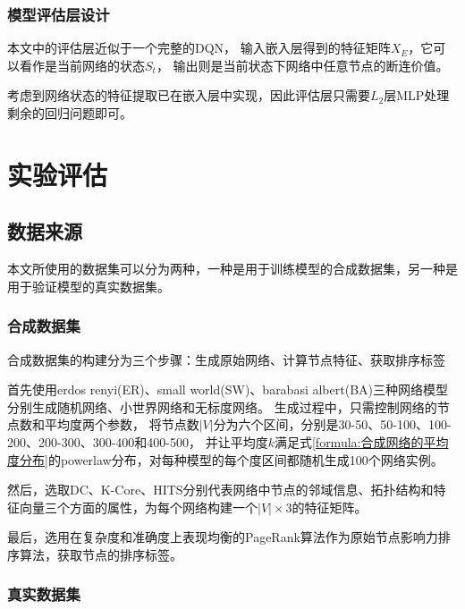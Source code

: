 \documentclass[twocolumn]{morningstar}
\begin{document}
\subsubsection{模型评估层设计}\label{sec:ValuingLayer}

本文中的评估层近似于一个完整的DQN，
输入嵌入层得到的特征矩阵$X_E$，它可以看作是当前网络的状态$S_t$，
输出则是当前状态下网络中任意节点的断连价值。



考虑到网络状态的特征提取已在嵌入层中实现，因此评估层只需要$L_2$层MLP处理剩余的回归问题即可。


\section{实验评估}\label{sec:ExperimentalEvaluation}

\subsection{数据来源}\label{sec:DataCollection}

本文所使用的数据集可以分为两种，一种是用于训练模型的合成数据集，另一种是用于验证模型的真实数据集。


\subsubsection{合成数据集}\label{sec:SyntheticDataset}

合成数据集的构建分为三个步骤：生成原始网络、计算节点特征、获取排序标签

首先使用erdos renyi(ER)、small world(SW)、barabasi albert(BA)三种网络模型分别生成随机网络、小世界网络和无标度网络。
生成过程中，只需控制网络的节点数和平均度两个参数，
将节点数$|V|$分为六个区间，分别是30-50、50-100、100-200、200-300、300-400和400-500，
并让平均度$k$满足式\ref{formula:合成网络的平均度分布}的powerlaw分布，对每种模型的每个度区间都随机生成100个网络实例。



然后，选取DC、K-Core\cite{gao2021K-Core}、HITS分别代表网络中节点的邻域信息、拓扑结构和特征向量三个方面的属性，为每个网络构建一个$|V|\times3$的特征矩阵。

最后，选用在复杂度和准确度上表现均衡的PageRank算法作为原始节点影响力排序算法，获取节点的排序标签。


\subsubsection{真实数据集}\label{sec:RealDataset}
\end{document}
